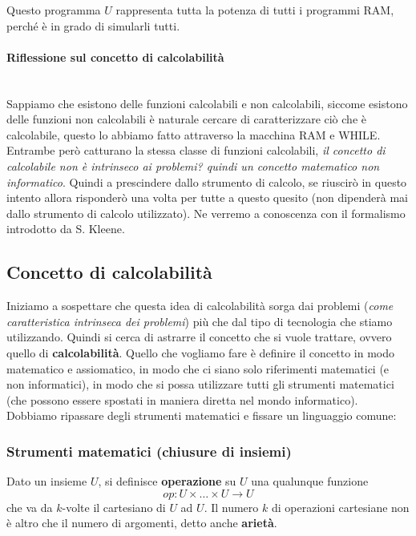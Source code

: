 \documentclass{article}
\begin{document}
Questo programma $U$ rappresenta tutta la potenza di tutti i programmi RAM, perché
è in grado di simularli tutti.

\paragraph{Riflessione sul concetto di calcolabilità}\mbox{}\\
Sappiamo che esistono delle funzioni calcolabili e non calcolabili, siccome esistono delle funzioni
non calcolabili è naturale cercare di caratterizzare ciò che è calcolabile, questo lo abbiamo
fatto attraverso la macchina RAM e WHILE. Entrambe però catturano la stessa classe di funzioni
calcolabili, \textit{il concetto di calcolabile non è intrinseco ai problemi? quindi
    un concetto matematico non informatico}.
Quindi a prescindere dallo strumento di calcolo, se riuscirò in questo intento
allora risponderò una volta per tutte a questo quesito (non dipenderà mai
dallo strumento di calcolo utilizzato). Ne verremo a conoscenza con il formalismo
introdotto da S. Kleene.

\subsection{Concetto di calcolabilità}
Iniziamo a sospettare che questa idea di calcolabilità sorga dai problemi
(\textit{come caratteristica intrinseca dei problemi}) più che dal
tipo di tecnologia che stiamo utilizzando. Quindi si cerca di astrarre il concetto che
si vuole trattare, ovvero quello di \textbf{calcolabilità}.
Quello che vogliamo fare è definire il concetto in modo matematico e assiomatico, in modo
che ci siano solo riferimenti matematici (e non informatici), in modo che si possa utilizzare
tutti gli strumenti matematici (che possono essere spostati in maniera diretta nel mondo informatico).
Dobbiamo ripassare degli strumenti matematici e fissare un linguaggio comune:

\subsubsection{Strumenti matematici (chiusure di insiemi)}
Dato un insieme $U$, si definisce \textbf{operazione} su $U$ una qualunque
funzione
$$op:U\times\dots\times U\rightarrow U$$
che va da $k$-volte il cartesiano di $U$ ad $U$. Il numero $k$ di operazioni cartesiane
non è altro che il numero di argomenti, detto anche \textbf{arietà}.
\end{document}
